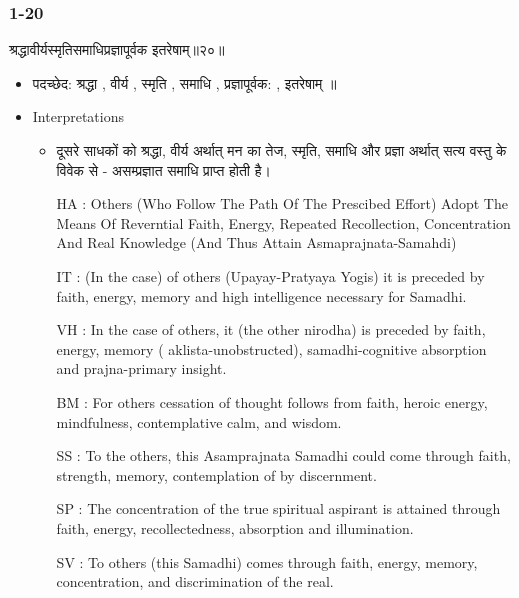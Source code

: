 \begin{frame}[fragile]\frametitle{1-20}
\begin{sanskrit}
श्रद्धावीर्यस्मृतिसमाधिप्रज्ञापूर्वक इतरेषाम्॥२०॥
\end{sanskrit}

	\begin{itemize}
	\item पदच्छेद: श्रद्धा , वीर्य , स्मृति , समाधि , प्रज्ञापूर्वक: , इतरेषाम् ॥
	\item Interpretations
		\begin{itemize}	
		\item दूसरे साधकों को श्रद्धा, वीर्य अर्थात् मन का तेज, स्मृति, समाधि और प्रज्ञा अर्थात् सत्य वस्तु के विवेक से - असम्प्रज्ञात समाधि प्राप्त होती है।
		\item [HA]: Others (Who Follow The Path Of The Prescibed Effort) Adopt The Means Of Reverntial Faith, Energy, Repeated Recollection, Concentration And Real Knowledge (And Thus Attain Asmaprajnata-Samahdi)
		\item [IT]: (In the case) of others (Upayay-Pratyaya Yogis) it is preceded by faith, energy, memory and high intelligence necessary for Samadhi.
		\item [VH]: In the case of others, it (the other nirodha) is preceded by faith, energy, memory ( aklista-unobstructed), samadhi-cognitive absorption and prajna-primary insight.
		\item [BM]: For others cessation of thought follows from faith, heroic energy, mindfulness, contemplative calm, and wisdom.
		\item [SS]: To the others, this Asamprajnata Samadhi could come through faith, strength, memory, contemplation of by discernment.
		\item [SP]: The concentration of the true spiritual aspirant is attained through faith, energy, recollectedness, absorption and illumination.
		\item [SV]: To others (this Samadhi) comes through faith, energy, memory, concentration, and discrimination of the real. 
		\end{itemize}
	\end{itemize}
	
\end{frame}

